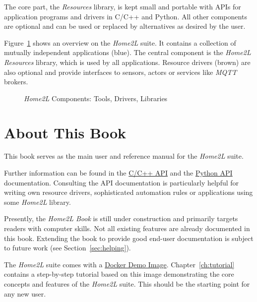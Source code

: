 \documentclass[12pt,english,parskip=half,headheight=19pt]{scrreprt}
\newcommand{\figsvg}[2][]{}            %
\newcommand{\figsvg}[2][]{\href{#2}{}} %
\newcommand{\refdoc}[2]{\href{#1}{#2}}              %
\newcommand{\theapic}{\refdoc{home2l-api_c/index.html}{C/C++ API}}
\newcommand{\theapipython}{\refdoc{home2l-api_python/index.html}{Python API}}
\begin{document}
The core part, the \textit{Resources} library, is kept small and portable with APIs for application programs and drivers in C/C++ and Python. All other components are optional and can be used or replaced by alternatives as desired by the user.

Figure~\ref{fig:home2l-components} shows an overview on the \textit{Home2L} suite. It contains a collection of mutually independent applications (blue). The central component is the \textit{Home2L Resources} library, which is used by all applications. Resource drivers (brown) are also optional and provide interfaces to sensors, actors or services like \textit{MQTT} brokers.

\begin{figure}[ht]
  \centering
  \figsvg[width=0.9\linewidth]{figs/home2l-components.svg}
  \caption[l]{\textit{Home2L} Components:
    \textcolor[rgb]{0.2,0.3,1.0}{Tools},
    \textcolor[rgb]{0.5,0.25,0}{Drivers},
    \textcolor[rgb]{0,0.5,0}{Libraries}
  }
  \label{fig:home2l-components}
\end{figure}



\clearpage
\section{About This Book}
\label{sec:intro-about}

This book serves as the main user and reference manual for the \textit{Home2L} suite.

Further information can be found in the \theapic{} and the \theapipython{} documentation.
Consulting the API documentation is particularly helpful for writing own resource drivers,
sophisticated automation rules or applications using some \textit{Home2L} library.

Presently, the \textit{Home2L Book} is still under construction and primarily targets readers
with computer skills. Not all existing features are already documented in this book.
Extending the book to provide good end-user documentation is subject to future work
(see Section~\ref{sec:helping}).

The \textit{Home2L} suite comes with a \hyperref[sec:tutorial-start]{Docker Demo Image}. Chapter~\ref{ch:tutorial} contains a step-by-step tutorial based on this image demonstrating the core concepts and features of the \textit{Home2L} suite. This should be the starting point for any new user.
\end{document}
